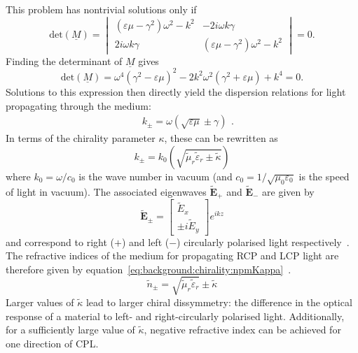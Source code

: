 This problem has nontrivial solutions only if 
\begin{equation}
    \mathrm{det}(\underline{M}) = 
    \begin{vmatrix}
        (\varepsilon \mu - \gamma^2)\omega^2 -k^2  & -2 i \omega k \gamma \\ 
		2 i \omega k \gamma & (\varepsilon \mu - \gamma^2)\omega^2 -k^2
    \end{vmatrix}    
    = 0.
\end{equation}
Finding the determinant of $\underline{M}$ gives
\begin{equation}
    \mathrm{det}(\underline{M}) = 
    \omega^4 (\gamma^2 - \varepsilon \mu)^2 - 2 k^2 \omega^2 (\gamma^2 + \varepsilon \mu) + k^4
    = 0.
\end{equation}
Solutions to this expression then directly yield the dispersion relations for light propagating through the medium:
\begin{equation}
    \begin{split}
        & k_{\pm} = \omega (\sqrt{\varepsilon \mu} \pm \gamma)
    \end{split}.
\end{equation}
In terms of the chirality parameter $\kappa$, these can be rewritten as
\begin{equation}\label{eq:background:chirality:kpmKappa}
    {k_\pm } = {k_0}\left( \sqrt {\tilde \mu_r \tilde \varepsilon_r \pm \tilde \kappa } \right)
\end{equation}
where $k_0=\omega / c_0$ is the wave number in vacuum (and $c_0=1/\sqrt {{\mu _0}{\varepsilon _0}}$ is the speed of light in vacuum). The associated eigenwaves $\mathbf{\tilde E}_+$ and $\mathbf{\tilde E}_-$ are given by
\begin{equation}
    \mathbf{\tilde E}_{\pm} = \begin{bmatrix}\tilde E_x\\ \pm i \tilde E_y\end{bmatrix} e^{i k z}
\end{equation}
and correspond to right ($+$) and left ($-$) circularly polarised light respectively~\cite[\S 2.2]{Lekner1999}\cite{Chern2013}.
The refractive indices of the medium for propagating RCP and LCP light are therefore given by equation~\ref{eq:background:chirality:npmKappa}~\cite{Capolino2009, Qiu2008, Valev2013b}. 
\begin{equation}\label{eq:background:chirality:npmKappa}
    {\tilde n_ \pm } = \sqrt {\tilde \mu_r \tilde \varepsilon_r}  \pm \tilde \kappa
\end{equation}
Larger values of $\tilde \kappa$ lead to larger chiral dissymmetry: the difference in the optical response of a material to left- and right-circularly polarised light.
Additionally, for a sufficiently large value of $\tilde \kappa$, negative refractive index can be achieved for one direction of CPL.

